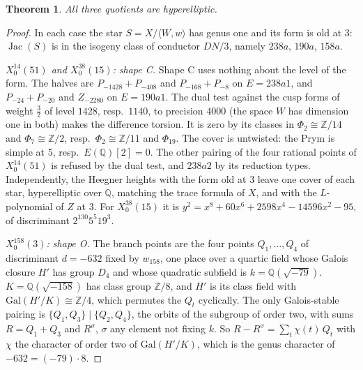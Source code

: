\documentclass[11pt,reqno]{amsart}
\theoremstyle{plain}
\newtheorem{theorem}{Theorem}[section]
\theoremstyle{definition}
\DeclareMathOperator{\Jac}{Jac}
\newcommand{\Q}{\mathbb{Q}}
\newcommand{\Z}{\mathbb{Z}}
\begin{document}
\begin{theorem}
All three quotients are hyperelliptic.
\end{theorem}

\begin{proof}
In each case the star $S=X/\langle W,w\rangle$ has genus one and its form is old at $3$: $\Jac(S)$ is in the
isogeny class of conductor $DN/3$, namely $238a$, $190a$, $158a$.

\emph{$X_0^{14}(51)$ and $X_0^{38}(15)$: shape C.} Shape C uses nothing about the level of the form. The halves
are $P_{-1428}+P_{-408}$ and $P_{-168}+P_{-8}$ on $E=238a1$, and $P_{-24}+P_{-20}$ and $Z_{-2280}$ on $E=190a1$. The
dual test against the cusp forms of weight $\frac32$ of level $1428$, resp.\ $1140$, to precision $4000$ (the
space $W$ has dimension one in both) makes the difference torsion. It is zero by its classes in
$\Phi_2\cong\Z/14$ and $\Phi_7\cong\Z/2$, resp.\ $\Phi_2\cong\Z/11$ and $\Phi_{19}$. The cover is untwisted: the
Prym is simple at $5$, resp.\ $E(\Q)[2]=0$. The other pairing of the four rational points of $X_0^{14}(51)$ is
refused by the dual test, and $238a2$ by its reduction types. Independently, the Heegner heights with the
form old at $3$ leave one cover of each star, hyperelliptic over $\Q$, matching the trace formula of $X$, and
with the $L$-polynomial of $Z$ at $3$. For $X_0^{38}(15)$ it is $y^2=x^8+60x^6+2598x^4-14596x^2-95$, of
discriminant $2^{130}5^5 19^3$.

\emph{$X_0^{158}(3)$: shape O.} The branch points are the four points $Q_1,\dots,Q_4$ of discriminant $d=-632$
fixed by $w_{158}$, one place over a quartic field whose Galois closure $H'$ has group $D_4$ and whose
quadratic subfield is $k=\Q(\sqrt{-79})$. $K=\Q(\sqrt{-158})$ has class group $\Z/8$, and $H'$ is its class
field with $\mathrm{Gal}(H'/K)\cong\Z/4$, which permutes the $Q_t$ cyclically. The only Galois-stable pairing
is $\{Q_1,Q_3\}\mid\{Q_2,Q_4\}$, the orbits of the subgroup of order two, with sums $R=Q_1+Q_3$ and $R^\sigma$,
$\sigma$ any element not fixing $k$. So $R-R^\sigma=\sum_t\chi(t)\,Q_t$ with $\chi$ the character of order two of
$\mathrm{Gal}(H'/K)$, which is the genus character of $-632=(-79)\cdot 8$.


\end{proof}
\end{document}

